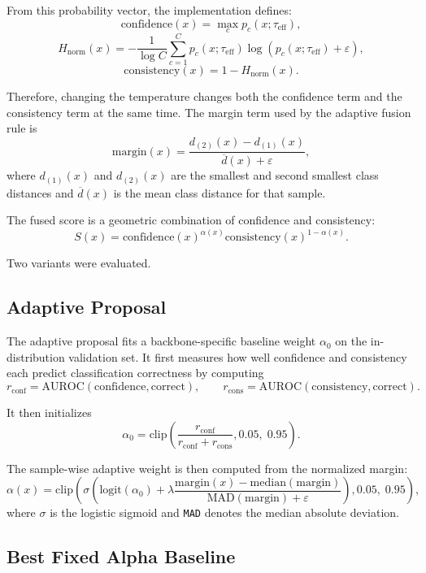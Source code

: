 \documentclass[11pt]{article}
\begin{document}
From this probability vector, the implementation defines:
\[
\mathrm{confidence}(x) = \max_c p_c(x;\tau_{\mathrm{eff}}),
\]
\[
H_{\mathrm{norm}}(x) =
-\frac{1}{\log C}\sum_{c=1}^{C} p_c(x;\tau_{\mathrm{eff}})
\log\left(p_c(x;\tau_{\mathrm{eff}}) + \varepsilon\right),
\]
\[
\mathrm{consistency}(x) = 1 - H_{\mathrm{norm}}(x).
\]

Therefore, changing the temperature changes both the confidence term and the consistency term at the same time. The margin term used by the adaptive fusion rule is
\[
\mathrm{margin}(x) =
\frac{d_{(2)}(x) - d_{(1)}(x)}
{\overline{d}(x) + \varepsilon},
\]
where $d_{(1)}(x)$ and $d_{(2)}(x)$ are the smallest and second smallest class distances and $\overline{d}(x)$ is the mean class distance for that sample.

The fused score is a geometric combination of confidence and consistency:
\[
S(x) =
\mathrm{confidence}(x)^{\alpha(x)}
\mathrm{consistency}(x)^{1-\alpha(x)}.
\]

Two variants were evaluated.

\subsection{Adaptive Proposal}

The adaptive proposal fits a backbone-specific baseline weight $\alpha_0$ on the in-distribution validation set. It first measures how well confidence and consistency each predict classification correctness by computing
\[
r_{\mathrm{conf}} = \mathrm{AUROC}(\mathrm{confidence}, \mathrm{correct}),
\qquad
r_{\mathrm{cons}} = \mathrm{AUROC}(\mathrm{consistency}, \mathrm{correct}).
\]

It then initializes
\[
\alpha_0 = \mathrm{clip}\left(
\frac{r_{\mathrm{conf}}}{r_{\mathrm{conf}} + r_{\mathrm{cons}}},
0.05,\;0.95
\right).
\]

The sample-wise adaptive weight is then computed from the normalized margin:
\[
\alpha(x) =
\mathrm{clip}\left(
\sigma\left(
\mathrm{logit}(\alpha_0) +
\lambda
\frac{\mathrm{margin}(x) - \mathrm{median}(\mathrm{margin})}
{\mathrm{MAD}(\mathrm{margin}) + \varepsilon}
\right),
0.05,\;0.95
\right),
\]
where $\sigma$ is the logistic sigmoid and \texttt{MAD} denotes the median absolute deviation.

\subsection{Best Fixed Alpha Baseline}
\end{document}
